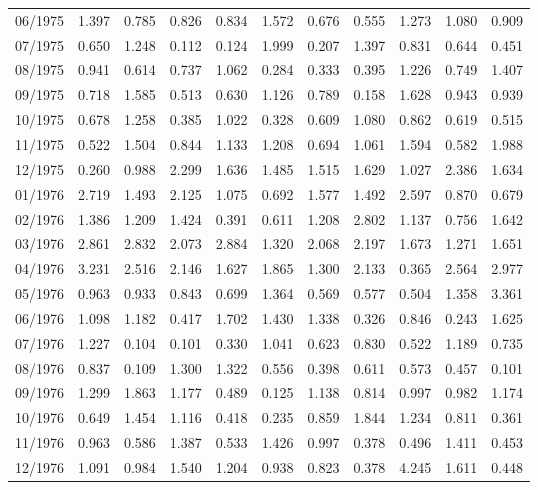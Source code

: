 \begin{tabular}{lrrrrrrrrrr}
06/1975 &  1.397 &  0.785 &  0.826 &  0.834 &  1.572 &  0.676 &  0.555 &  1.273 &  1.080 &  0.909 \\
07/1975 &  0.650 &  1.248 &  0.112 &  0.124 &  1.999 &  0.207 &  1.397 &  0.831 &  0.644 &  0.451 \\
08/1975 &  0.941 &  0.614 &  0.737 &  1.062 &  0.284 &  0.333 &  0.395 &  1.226 &  0.749 &  1.407 \\
09/1975 &  0.718 &  1.585 &  0.513 &  0.630 &  1.126 &  0.789 &  0.158 &  1.628 &  0.943 &  0.939 \\
10/1975 &  0.678 &  1.258 &  0.385 &  1.022 &  0.328 &  0.609 &  1.080 &  0.862 &  0.619 &  0.515 \\
11/1975 &  0.522 &  1.504 &  0.844 &  1.133 &  1.208 &  0.694 &  1.061 &  1.594 &  0.582 &  1.988 \\
12/1975 &  0.260 &  0.988 &  2.299 &  1.636 &  1.485 &  1.515 &  1.629 &  1.027 &  2.386 &  1.634 \\
01/1976 &  2.719 &  1.493 &  2.125 &  1.075 &  0.692 &  1.577 &  1.492 &  2.597 &  0.870 &  0.679 \\
02/1976 &  1.386 &  1.209 &  1.424 &  0.391 &  0.611 &  1.208 &  2.802 &  1.137 &  0.756 &  1.642 \\
03/1976 &  2.861 &  2.832 &  2.073 &  2.884 &  1.320 &  2.068 &  2.197 &  1.673 &  1.271 &  1.651 \\
04/1976 &  3.231 &  2.516 &  2.146 &  1.627 &  1.865 &  1.300 &  2.133 &  0.365 &  2.564 &  2.977 \\
05/1976 &  0.963 &  0.933 &  0.843 &  0.699 &  1.364 &  0.569 &  0.577 &  0.504 &  1.358 &  3.361 \\
06/1976 &  1.098 &  1.182 &  0.417 &  1.702 &  1.430 &  1.338 &  0.326 &  0.846 &  0.243 &  1.625 \\
07/1976 &  1.227 &  0.104 &  0.101 &  0.330 &  1.041 &  0.623 &  0.830 &  0.522 &  1.189 &  0.735 \\
08/1976 &  0.837 &  0.109 &  1.300 &  1.322 &  0.556 &  0.398 &  0.611 &  0.573 &  0.457 &  0.101 \\
09/1976 &  1.299 &  1.863 &  1.177 &  0.489 &  0.125 &  1.138 &  0.814 &  0.997 &  0.982 &  1.174 \\
10/1976 &  0.649 &  1.454 &  1.116 &  0.418 &  0.235 &  0.859 &  1.844 &  1.234 &  0.811 &  0.361 \\
11/1976 &  0.963 &  0.586 &  1.387 &  0.533 &  1.426 &  0.997 &  0.378 &  0.496 &  1.411 &  0.453 \\
12/1976 &  1.091 &  0.984 &  1.540 &  1.204 &  0.938 &  0.823 &  0.378 &  4.245 &  1.611 &  0.448 \\

\end{tabular}

